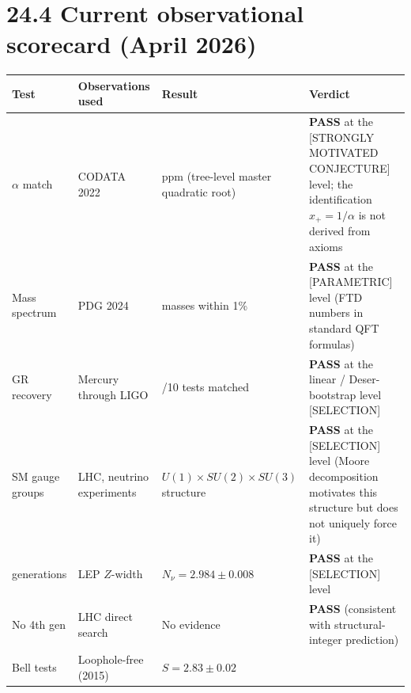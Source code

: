 \documentclass[
  11pt,
  letterpaper,
  twoside,
  openright]{book}
\begin{document}
\section{24.4 Current observational scorecard (April
2026)}\label{current-observational-scorecard-april-2026}

\begin{longtable}[]{@{}
  >{\raggedright\arraybackslash}p{}
  >{\raggedright\arraybackslash}p{}
  >{\raggedright\arraybackslash}p{}
  >{\raggedright\arraybackslash}p{}@{}}
\toprule\noalign{}
\begin{minipage}[b]{\linewidth}\raggedright
Test
\end{minipage} & \begin{minipage}[b]{\linewidth}\raggedright
Observations used
\end{minipage} & \begin{minipage}[b]{\linewidth}\raggedright
Result
\end{minipage} & \begin{minipage}[b]{\linewidth}\raggedright
Verdict
\end{minipage} \\
\midrule\noalign{}
\endhead
\bottomrule\noalign{}
\endlastfoot
\(\alpha\) match & CODATA 2022 & 1.26 ppm (tree-level master quadratic
root) & \textbf{PASS} at the {[}STRONGLY MOTIVATED CONJECTURE{]} level;
the identification \(x_+ = 1/\alpha\) is not derived from axioms \\
Mass spectrum & PDG 2024 & 6 masses within 1\% & \textbf{PASS} at the
{[}PARAMETRIC{]} level (FTD numbers in standard QFT formulas) \\
GR recovery & Mercury through LIGO & 10/10 tests matched & \textbf{PASS}
at the linear / Deser-bootstrap level {[}SELECTION{]} \\
SM gauge groups & LHC, neutrino experiments &
\(U(1) \times SU(2) \times SU(3)\) structure & \textbf{PASS} at the
{[}SELECTION{]} level (Moore decomposition motivates this structure but
does not uniquely force it) \\
3 generations & LEP \(Z\)-width & \(N_\nu = 2.984 \pm 0.008\) &
\textbf{PASS} at the {[}SELECTION{]} level \\
No 4th gen & LHC direct search & No evidence & \textbf{PASS} (consistent
with structural-integer prediction) \\
Bell tests & Loophole-free (2015) & \(S = 2.83 \pm 0.02\) &

\end{longtable}
\end{document}
